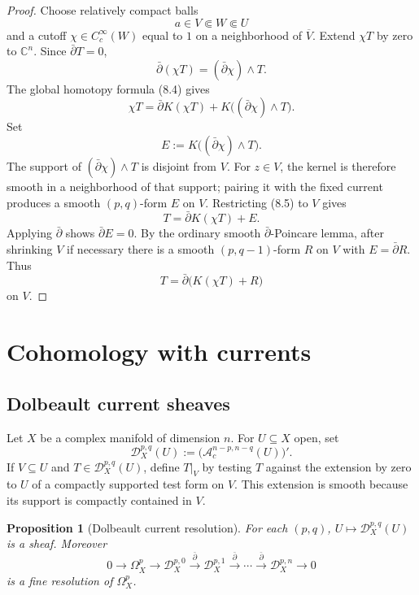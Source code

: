 \documentclass[11pt,a4paper]{article}
\newtheorem{proposition}[theorem]{Proposition}
\theoremstyle{definition}
\theoremstyle{remark}
\newcommand{\C}{\mathbb C}
\newcommand{\A}{\mathcal A}
\newcommand{\Dcur}{\mathcal D}
\newcommand{\ddbar}{\bar\partial}
\begin{document}
\begin{proof}
Choose relatively compact balls
\[
a\in V\Subset W\Subset U
\]
and a cutoff $\chi\in C_c^\infty(W)$ equal to $1$ on a neighborhood of $\overline V$. Extend $\chi T$ by zero to $\C^n$. Since $\ddbar T=0$,
\[
\ddbar(\chi T)=(\ddbar\chi)\wedge T.
\]
The global homotopy formula (8.4) gives
\[
\chi T=\ddbar K(\chi T)+K\bigl((\ddbar\chi)\wedge T\bigr).
\tag{8.5}
\]
Set
\[
E:=K\bigl((\ddbar\chi)\wedge T\bigr).
\]
The support of $(\ddbar\chi)\wedge T$ is disjoint from $V$. For $z\in V$, the kernel is therefore smooth in a neighborhood of that support; pairing it with the fixed current produces a smooth $(p,q)$-form $E$ on $V$. Restricting (8.5) to $V$ gives
\[
T=\ddbar K(\chi T)+E.
\]
Applying $\ddbar$ shows $\ddbar E=0$. By the ordinary smooth $\bar\partial$-Poincare lemma, after shrinking $V$ if necessary there is a smooth $(p,q-1)$-form $R$ on $V$ with $E=\ddbar R$. Thus
\[
T=\ddbar\bigl(K(\chi T)+R\bigr)
\]
on $V$.
\end{proof}

\section{Cohomology with currents}

\subsection{Dolbeault current sheaves}

Let $X$ be a complex manifold of dimension $n$. For $U\subseteq X$ open, set
\[
\Dcur_X^{p,q}(U)
:=\bigl(\A_c^{n-p,n-q}(U)\bigr)'.
\]
If $V\subseteq U$ and $T\in\Dcur_X^{p,q}(U)$, define $T|_V$ by testing $T$ against the extension by zero to $U$ of a compactly supported test form on $V$. This extension is smooth because its support is compactly contained in $V$.

\begin{proposition}[Dolbeault current resolution]
For each $(p,q)$, $U\mapsto\Dcur_X^{p,q}(U)$ is a sheaf. Moreover
\[
0\longrightarrow\Omega_X^p
\longrightarrow\Dcur_X^{p,0}
\xrightarrow{\ddbar}\Dcur_X^{p,1}
\xrightarrow{\ddbar}\cdots
\xrightarrow{\ddbar}\Dcur_X^{p,n}
\longrightarrow0
\tag{9.1}
\]
is a fine resolution of $\Omega_X^p$.
\end{proposition}
\end{document}
